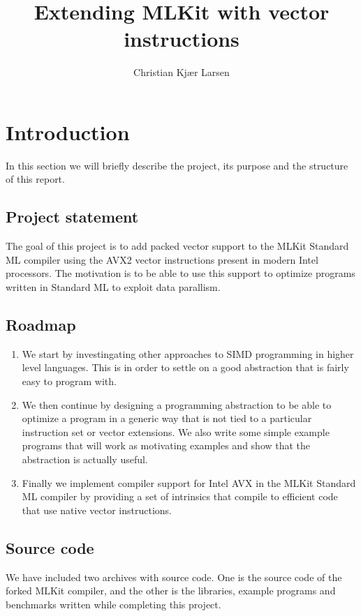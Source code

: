 \documentclass{article}
\title{Extending MLKit with vector instructions}
\author{Christian Kjær Larsen}
\begin{document}
\maketitle

\tableofcontents

\section{Introduction}

In this section we will briefly describe the project, its purpose and the structure of this report.

\subsection{Project statement}

The goal of this project is to add packed vector support to the MLKit\cite{mlkit} Standard ML compiler using the AVX2 vector instructions present in modern Intel processors. The motivation is to be able to use this support to optimize programs written in Standard ML to exploit data parallism.

\subsection{Roadmap}

\begin{enumerate}
    \item We start by investingating other approaches to SIMD programming in higher level languages. This is in order to settle on a
        good abstraction that is fairly easy to program with.
    \item
        We then continue by designing a programming abstraction to be able to optimize a program in a generic way that is not tied to a particular instruction set or vector extensions.
        We also write some simple example programs that will work as motivating examples and show that the abstraction is actually useful.
    \item
        Finally we implement compiler support for Intel AVX in the MLKit Standard ML compiler by providing a set of intrinsics that compile to efficient code that use native vector instructions.
\end{enumerate}

\subsection{Source code}
We have included two archives with source code. One is the source code of the forked MLKit compiler, and the other is the libraries, example programs and benchmarks written while completing this project.
\end{document}

